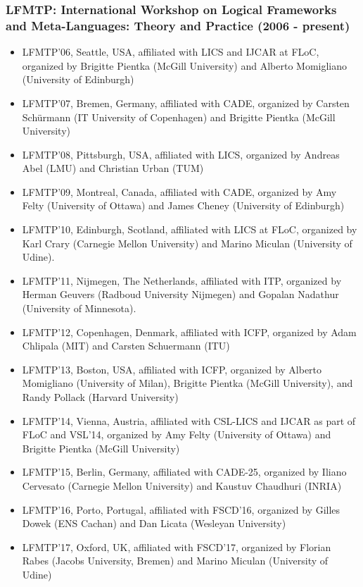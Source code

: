 \documentclass{article}
\begin{document}
\subsubsection{LFMTP: International Workshop on Logical Frameworks and Meta-Languages: Theory and Practice (2006 - present)}

\begin{itemize}
\item LFMTP'06, Seattle, USA, affiliated with LICS and IJCAR at FLoC,
     organized by Brigitte Pientka (McGill University) and Alberto
     Momigliano (University of Edinburgh)

\item LFMTP'07, Bremen, Germany, affiliated with CADE, organized by
     Carsten Schürmann (IT University of Copenhagen) and Brigitte
     Pientka (McGill University)

\item LFMTP'08, Pittsburgh, USA, affiliated with LICS, organized by
     Andreas Abel (LMU) and Christian Urban (TUM)

\item LFMTP'09, Montreal, Canada, affiliated with CADE, organized by
     Amy Felty (University of Ottawa) and James Cheney (University of
     Edinburgh)

\item LFMTP'10, Edinburgh, Scotland, affiliated with LICS at FLoC,
     organized by Karl Crary (Carnegie Mellon University) and Marino
     Miculan (University of Udine).

\item LFMTP'11, Nijmegen, The Netherlands, affiliated with ITP,
     organized by Herman Geuvers (Radboud University Nijmegen) and
     Gopalan Nadathur (University of Minnesota).

\item LFMTP'12, Copenhagen, Denmark, affiliated with ICFP, organized
     by Adam Chlipala (MIT) and Carsten Schuermann (ITU)

\item LFMTP'13, Boston, USA, affiliated with ICFP, organized by Alberto
     Momigliano (University of Milan), Brigitte Pientka (McGill
     University), and Randy Pollack (Harvard University)

\item LFMTP'14, Vienna, Austria, affiliated with CSL-LICS and IJCAR as
     part of FLoC and VSL'14, organized by Amy Felty (University of
     Ottawa) and Brigitte Pientka (McGill University)

\item LFMTP'15, Berlin, Germany, affiliated with CADE-25, organized by
     Iliano Cervesato (Carnegie Mellon University) and Kaustuv
     Chaudhuri (INRIA)

\item LFMTP'16, Porto, Portugal, affiliated with FSCD'16, organized by
     Gilles Dowek (ENS Cachan) and Dan Licata (Wesleyan University)

\item LFMTP'17, Oxford, UK, affiliated with FSCD'17, organized by
     Florian Rabes (Jacobs University, Bremen) and Marino Miculan
     (University of Udine)
\end{itemize}
   
\end{document}
